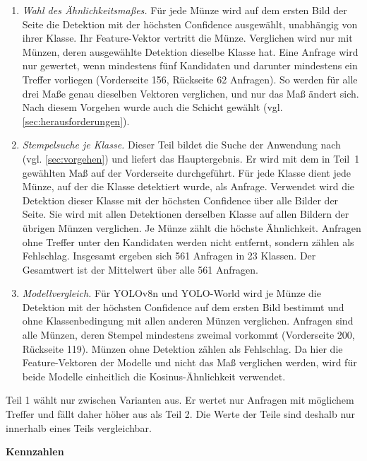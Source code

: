 \begin{enumerate}
    \item \textit{Wahl des Ähnlichkeitsmaßes.} Für jede Münze wird auf dem ersten Bild der Seite die Detektion mit der höchsten Confidence ausgewählt, unabhängig von ihrer Klasse. Ihr Feature-Vektor vertritt die Münze. Verglichen wird nur mit Münzen, deren ausgewählte Detektion dieselbe Klasse hat. Eine Anfrage wird nur gewertet, wenn mindestens fünf Kandidaten und darunter mindestens ein Treffer vorliegen (Vorderseite 156, Rückseite 62 Anfragen). So werden für alle drei Maße genau dieselben Vektoren verglichen, und nur das Maß ändert sich. Nach diesem Vorgehen wurde auch die Schicht gewählt (vgl. \cref{sec:herausforderungen}).
    \item \textit{Stempelsuche je Klasse.} Dieser Teil bildet die Suche der Anwendung nach (vgl. \cref{sec:vorgehen}) und liefert das Hauptergebnis. Er wird mit dem in Teil~1 gewählten Maß auf der Vorderseite durchgeführt. Für jede Klasse dient jede Münze, auf der die Klasse detektiert wurde, als Anfrage. Verwendet wird die Detektion dieser Klasse mit der höchsten Confidence über alle Bilder der Seite. Sie wird mit allen Detektionen derselben Klasse auf allen Bildern der übrigen Münzen verglichen. Je Münze zählt die höchste Ähnlichkeit. Anfragen ohne Treffer unter den Kandidaten werden nicht entfernt, sondern zählen als Fehlschlag. Insgesamt ergeben sich 561 Anfragen in 23 Klassen. Der Gesamtwert ist der Mittelwert über alle 561 Anfragen.
    \item \textit{Modellvergleich.} Für YOLOv8n und YOLO-World wird je Münze die Detektion mit der höchsten Confidence auf dem ersten Bild bestimmt und ohne Klassenbedingung mit allen anderen Münzen verglichen. Anfragen sind alle Münzen, deren Stempel mindestens zweimal vorkommt (Vorderseite 200, Rückseite 119). Münzen ohne Detektion zählen als Fehlschlag. Da hier die Feature-Vektoren der Modelle und nicht das Maß verglichen werden, wird für beide Modelle einheitlich die Kosinus-Ähnlichkeit verwendet.
\end{enumerate}
 
\noindent Teil 1 wählt nur zwischen Varianten aus. Er wertet nur Anfragen mit möglichem Treffer und fällt daher höher aus als Teil 2. Die Werte der Teile sind deshalb nur innerhalb eines Teils vergleichbar.


\vspace{\baselineskip}

\noindent \textbf{Kennzahlen}

